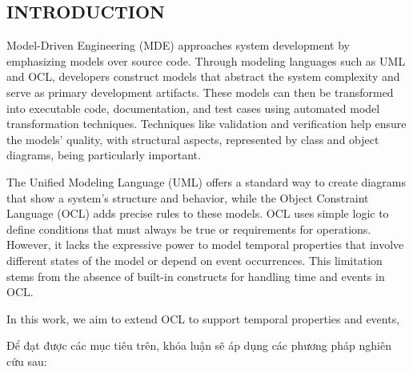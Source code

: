 \setcounter{page}{1}


\setlength{\parindent}{1cm}

\begin{center}
  \section*{INTRODUCTION}
\end{center}


\hspace{\parindent}Model-Driven Engineering (MDE) approaches system development 
by emphasizing models over source code. Through modeling languages such as UML 
and OCL, developers construct models that abstract the system complexity and serve as primary development artifacts. 
These models can then be transformed into executable code, documentation, and test cases using automated 
model transformation techniques. Techniques like validation and verification help 
ensure the models’ quality, with structural aspects, represented by class and object 
diagrams, being particularly important.

The Unified Modeling Language (UML) offers a standard way to create diagrams that show 
a system’s structure and behavior, while the Object Constraint Language (OCL) adds precise 
rules to these models. OCL uses simple logic to define conditions that must always be true 
or requirements for operations. However, it lacks the expressive power to model temporal properties 
that involve different states of the model or depend on event occurrences. 
This limitation stems from the absence of built-in constructs for handling time and events in OCL.


In this work, we aim to extend OCL to support temporal properties and events,

\hspace{\parindent}

Để đạt được các mục tiêu trên, khóa luận sẽ áp dụng các phương pháp nghiên cứu
sau:

